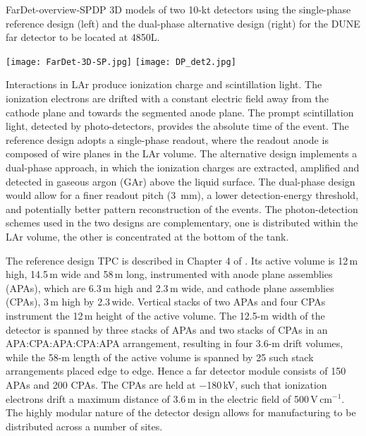 \begin{cdrfigure}{FarDet-overview-SPDP}
{3D models of two 10-kt detectors using the single-phase reference design (left) 
and the dual-phase alternative design (right) for the DUNE far detector to be 
located at 4850L.}
\centering
\begin{minipage}[b]{1.0\textwidth}
\begin{center}
\texttt{[image: FarDet-3D-SP.jpg]}
\texttt{[image: DP\_det2.jpg]}
\end{center}
\end{minipage}
\end{cdrfigure}


Interactions in LAr produce ionization charge and scintillation light.
The ionization electrons are drifted with a constant electric field away from the cathode
plane and towards the segmented anode plane. 
The prompt scintillation light,
detected by photo-detectors, provides the absolute time of the event.
The reference design adopts a single-phase readout, where the readout anode is composed of wire planes in the LAr volume. 
The alternative design implements a  dual-phase approach, in which the 
ionization charges are extracted, amplified and detected in gaseous argon (GAr) above the liquid surface. 
The dual-phase design would allow for a finer readout pitch (3~mm), 
a lower detection-energy threshold, and potentially better pattern reconstruction of the events.
The photon-detection schemes used in the two designs are complementary, one is distributed
within the LAr volume, the other is concentrated at the bottom of the tank.

The  reference design TPC is described in Chapter 4 of \voldune. 
Its active volume is 12\,m high, 14.5\,m wide and 
58\,m long, instrumented with anode plane assemblies (APAs), 
which are 6.3\,m high and 2.3\,m wide, and cathode plane assemblies (CPAs), 3\,m high by 2.3\,wide. 
Vertical stacks of
two APAs and four CPAs %
instrument the 12\,m height of the active volume. The 12.5-m width of the detector is 
spanned by three stacks of APAs and two stacks of CPAs in an APA:CPA:APA:CPA:APA
arrangement, resulting in four 3.6-m drift volumes, while the 58-m length of the active volume
is spanned by 25 such stack arrangements placed edge to edge. Hence a  
far detector module consists of 150 APAs and 200 CPAs. The CPAs are held at $-$180\,kV, such that 
ionization electrons drift a maximum distance of 3.6\,m in the electric field of 500\,V\,cm$^{-1}$.
The highly modular nature of the detector design allows for manufacturing to be distributed across a number of sites.

